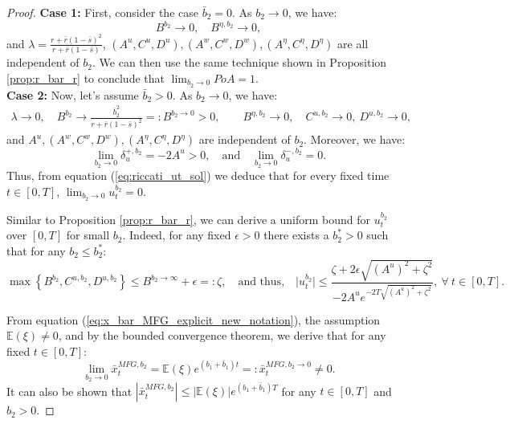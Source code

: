 \documentclass[11pt]{article}
\begin{document}
\begin{proof}
	\textbf{Case 1:} First, consider the case $\bar{b}_2 =0$. As $b_2 \to 0$, we have:
	\begin{equation*}
		B^{b_2} \to 0, \quad B^{\eta,b_2} \to 0,
	\end{equation*}
	and $\lambda = \frac{r + \bar{r}(1- \bar{s})^2}{r + \bar{r}(1-\bar{s})}$, $(A^{u},C^{u}, D^{u}), (A^{w}, C^{w}, D^{w}), (A^\eta, C^\eta, D^\eta)$ are all independent of $b_2$. We can then use the same technique shown in Proposition \ref{prop:r_bar_r} to conclude that $\lim_{b_2 \to 0} PoA = 1.$\\
	
	\textbf{Case 2:} Now, let's assume $\bar{b}_2 > 0$.	As $b_2 \to 0$, we have:
	\begin{equation*}
	\begin{array}{l}
		\lambda \longrightarrow 0, \quad \displaystyle B^{b_2} \longrightarrow{}  \frac{\bar{b}_2^2}{r + \bar{r}(1-\bar{s})^2}=:B^{b_2 \to 0} >0, \qquad B^{\eta,b_2} \longrightarrow{} 0, \quad C^{u,b_2} \longrightarrow{} 0, \  D^{u,b_2} \longrightarrow{} 0,
	\end{array}
	\end{equation*}
	and $A^u, (A^w, C^w, D^w), (A^\eta, C^\eta, D^\eta)$ are independent of $b_2$.
	Moreover, we have:
	$$\lim_{b_2 \to 0}\delta^{+,b_2}_u =-2A^u >0, \quad \text{and} \quad \lim_{b_2 \to 0}\delta^{-,b_2}_u = 0.$$
	Thus, from equation (\ref{eq:riccati_ut_sol}) we deduce that for every fixed time $t \in [0,T]$, $\lim_{b_2 \to 0}u^{b_2}_t = 0.$
	
	Similar to Proposition \ref{prop:r_bar_r}, we can derive a uniform bound for $u_t^{b_2}$ over $[0,T]$ for small $b_2$. Indeed, for any fixed $\epsilon >0$ there exists a $b_2^* >0$ such that for any $b_2 \leq b_2^*$:
	$$\max \left\{B^{b_2}, C^{u,b_2}, D^{u,b_2} \right\} \leq B^{b_2 \to \infty} + \epsilon =: \zeta, \quad \text{and thus,} \quad
	\vert u_t^{b_2} \vert \leq \frac{\zeta + 2 \epsilon \sqrt{(A^u)^2 + \zeta^2} }{- 2 A^u e^{-2T \sqrt{(A^u)^2 + \zeta^2} } } ,\ \forall  \  t \in [0,T].$$
	
	From equation (\ref{eq:x_bar_MFG_explicit_new_notation}), the assumption $\mathbb{E}(\xi)\neq 0$, and by the bounded convergence theorem, we derive that for any fixed $t \in [0,T]$:
	$$\lim_{b_2 \to 0} \bar{x}_t^{MFG,b_2} = \mathbb{E}(\xi) e^{(b_1+\bar{b}_1)t} =: \bar{x}_t^{MFG,b_2 \to 0} \neq 0.$$
	It can also be shown that $\left| \bar{x}_t^{MFG,b_2}\right| \leq \vert \mathbb{E}(\xi) \vert e^{(b_1 + \bar{b}_1) T}$ for any $t \in [0,T]$ and $b_2 > 0$.
	

\end{proof}
\end{document}
